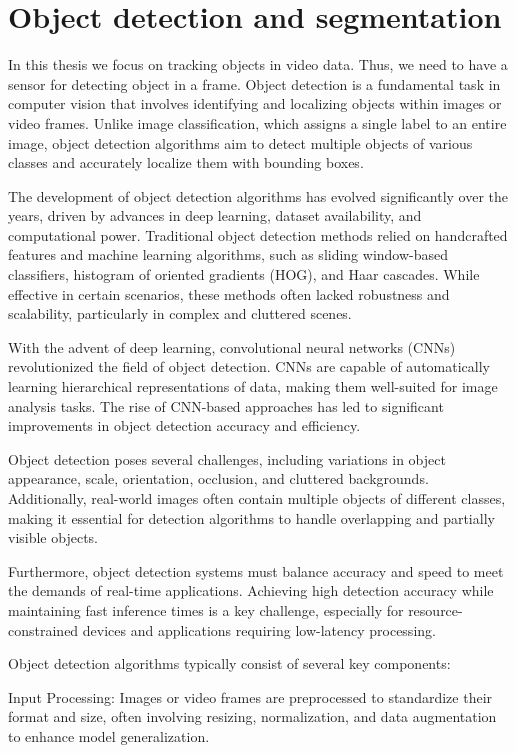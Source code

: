 \chapter{Object detection and segmentation}
In this thesis we focus on tracking objects in video data. Thus, we need to have a sensor for detecting object in a frame. Object detection is a fundamental task in computer vision that involves identifying and localizing objects within images or video frames. Unlike image classification, which assigns a single label to an entire image, object detection algorithms aim to detect multiple objects of various classes and accurately localize them with bounding boxes.

The development of object detection algorithms has evolved significantly over the years, driven by advances in deep learning, dataset availability, and computational power. Traditional object detection methods relied on handcrafted features and machine learning algorithms, such as sliding window-based classifiers, histogram of oriented gradients (HOG), and Haar cascades. While effective in certain scenarios, these methods often lacked robustness and scalability, particularly in complex and cluttered scenes.

With the advent of deep learning, convolutional neural networks (CNNs) revolutionized the field of object detection. CNNs are capable of automatically learning hierarchical representations of data, making them well-suited for image analysis tasks. The rise of CNN-based approaches has led to significant improvements in object detection accuracy and efficiency.

Object detection poses several challenges, including variations in object appearance, scale, orientation, occlusion, and cluttered backgrounds. Additionally, real-world images often contain multiple objects of different classes, making it essential for detection algorithms to handle overlapping and partially visible objects.

Furthermore, object detection systems must balance accuracy and speed to meet the demands of real-time applications. Achieving high detection accuracy while maintaining fast inference times is a key challenge, especially for resource-constrained devices and applications requiring low-latency processing.

Object detection algorithms typically consist of several key components:

Input Processing: Images or video frames are preprocessed to standardize their format and size, often involving resizing, normalization, and data augmentation to enhance model generalization.

